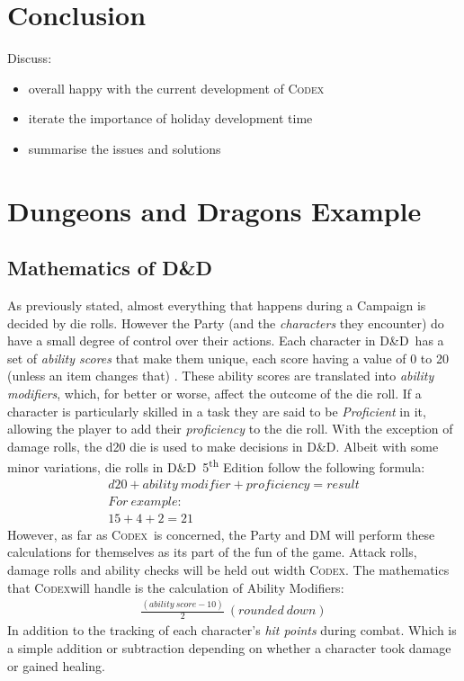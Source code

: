 \documentclass[progress]{cmpreport}
\newcommand{\dnd}{D\&D}
\newcommand{\Codex}{\textsc{Codex}}
\begin{document}
	\section{Conclusion}
	Discuss:
	\begin{itemize}
		\item overall happy with the current development of \Codex
			\subitem 
		\item iterate the importance of holiday development time
		\item summarise the issues and solutions
	\end{itemize}

	\clearpage
	\appendix
	\section{Dungeons and Dragons Example} \label{app:example}
	
	\subsection{Mathematics of \dnd}
	As previously stated, almost everything that happens during a Campaign is decided by die rolls. However the Party (and the \emph{characters} they encounter) do have a small degree of control over their actions. Each character in \dnd \ has a set of \emph{ability scores} that make them unique, each score having a value of 0 to 20 (unless an item changes that) \citep{PlayerHandbook}. These ability scores are translated into \emph{ability modifiers}, which, for better or worse, affect the outcome of the die roll. If a character is particularly skilled in a task they are said to be \emph{Proficient} in it, allowing the player to add their \emph{proficiency} to the die roll. With the exception of damage rolls, the d20 die is used to make decisions in \dnd. Albeit with some minor variations, die rolls in \dnd \ 5\textsuperscript{th} Edition follow the following formula:
	\begin{gather*}
	d20 + ability \ modifier + proficiency = result \\
	For \ example: \\
	15 + 4 + 2 = 21
	\end{gather*}
	However, as far as \Codex \ is concerned, the Party and DM will perform these calculations for themselves as its part of the fun of the game. Attack rolls, damage rolls and ability checks will be held out width \Codex. The mathematics that \Codex will handle is the calculation of Ability Modifiers:
	\begin{gather*}
	\frac{(ability \ score - 10)}{2} \ (rounded \ down)
	\end{gather*}
	In addition to the tracking of each character's \emph{hit points} during combat. Which is a simple addition or subtraction depending on whether a character took damage or gained healing.	
	
\end{document}
